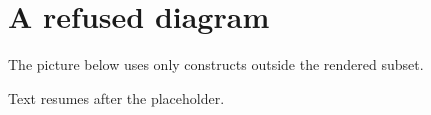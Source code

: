 \documentclass{article}
\begin{document}
\section{A refused diagram}

The picture below uses only constructs outside the rendered subset.


Text resumes after the placeholder.
\end{document}
